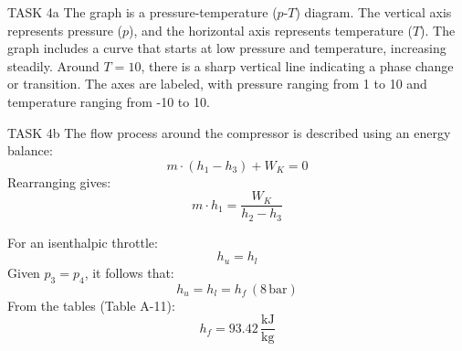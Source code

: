 TASK 4a  
The graph is a pressure-temperature (\(p\)-\(T\)) diagram. The vertical axis represents pressure (\(p\)), and the horizontal axis represents temperature (\(T\)). The graph includes a curve that starts at low pressure and temperature, increasing steadily. Around \(T = 10\), there is a sharp vertical line indicating a phase change or transition. The axes are labeled, with pressure ranging from 1 to 10 and temperature ranging from -10 to 10.  

TASK 4b  
The flow process around the compressor is described using an energy balance:  
\[
m \cdot (h_1 - h_3) + W_K = 0
\]  
Rearranging gives:  
\[
m \cdot h_1 = \frac{W_K}{h_2 - h_3}
\]  

For an isenthalpic throttle:  
\[
h_u = h_l
\]  
Given \(p_3 = p_4\), it follows that:  
\[
h_u = h_l = h_f \, (8 \, \text{bar})
\]  
From the tables (Table A-11):  
\[
h_f = 93.42 \, \frac{\text{kJ}}{\text{kg}}
\]